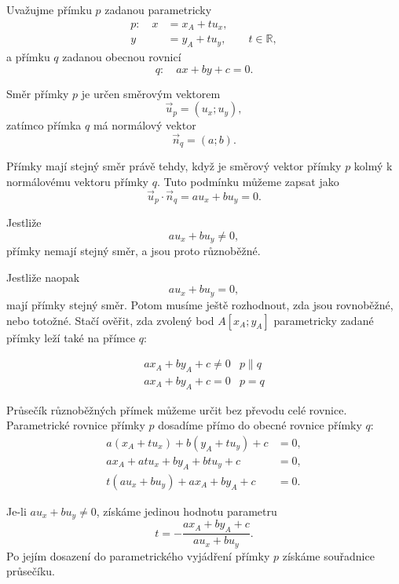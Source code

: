 Uvažujme přímku $p$ zadanou parametricky
\begin{equation}\label{eq:Mixed_parametric_general_p}
    \begin{aligned}
        p:\quad x&=x_A+t u_x,\\
                 y&=y_A+t u_y,
                 \qquad t\in\mathbb{R},
    \end{aligned}
\end{equation}
a přímku $q$ zadanou obecnou rovnicí
\begin{equation}\label{eq:Mixed_parametric_general_q}
    q:\quad ax+by+c=0.
\end{equation}

Směr přímky $p$ je určen směrovým vektorem
\[
    \vec{u}_p=(u_x;u_y),
\]
zatímco přímka $q$ má normálový vektor
\[
    \vec{n}_q=(a;b).
\]

Přímky mají stejný směr právě tehdy, když je směrový vektor přímky
$p$ kolmý k normálovému vektoru přímky $q$. Tuto podmínku můžeme
zapsat jako
\begin{equation}\label{eq:Mixed_parametric_general_parallel_condition}
    \vec{u}_p\cdot\vec{n}_q
    =
    au_x+bu_y
    =
    0.
\end{equation}

Jestliže
\[
    au_x+bu_y\neq0,
\]
přímky nemají stejný směr, a jsou proto různoběžné.

Jestliže naopak
\[
    au_x+bu_y=0,
\]
mají přímky stejný směr. Potom musíme ještě rozhodnout, zda jsou
rovnoběžné, nebo totožné. Stačí ověřit, zda zvolený bod
$A[x_A;y_A]$ parametricky zadané přímky leží také na přímce $q$:

\[
\begin{array}{c|c}
    ax_A+by_A+c\neq0
    &
    p\parallel q
    \\[1mm]
    ax_A+by_A+c=0
    &
    p=q
\end{array}
\]

Průsečík různoběžných přímek můžeme určit bez převodu celé rovnice.
Parametrické rovnice přímky $p$ dosadíme přímo do obecné rovnice
přímky $q$:
\begin{align*}
    a(x_A+t u_x)+b(y_A+t u_y)+c&=0,\\
    ax_A+at u_x+by_A+bt u_y+c&=0,\\
    t(au_x+bu_y)+ax_A+by_A+c&=0.
\end{align*}

Je-li $au_x+bu_y\neq0$, získáme jedinou hodnotu parametru
\begin{equation}\label{eq:Mixed_parametric_general_intersection_parameter}
    t
    =
    -\frac{ax_A+by_A+c}{au_x+bu_y}.
\end{equation}
Po jejím dosazení do parametrického vyjádření přímky $p$ získáme
souřadnice průsečíku.

